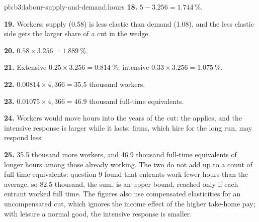 \begin{solution}{pb:b3:labour-supply-and-demand:hours}
\textbf{18.} $5 - 3.256 = 1.744~\%$.

\textbf{19.} Workers: supply (0.58) is less elastic than demand (1.08), and the less elastic
side gets the larger share of a cut in the wedge.

\textbf{20.} $0.58 \times 3.256 = 1.889~\%$.

\textbf{21.} Extensive $0.25 \times 3.256 = 0.814~\%$; intensive $0.33 \times 3.256 = 1.075~\%$.

\textbf{22.} $0.00814 \times 4{,}366 = 35.5$ thousand workers.

\textbf{23.} $0.01075 \times 4{,}366 = 46.9$ thousand full-time equivalents.

\textbf{24.} Workers would move hours into the years of the cut: the 
applies, and the intensive response is larger while it lasts; firms, which hire for
the long run, may respond less.

\textbf{25.} 35.5 thousand more workers, and 46.9 thousand full-time equivalents of longer
hours among those already working. The two do not add up to a count of full-time
equivalents: question 9 found that entrants work fewer hours than the average, so
82.5 thousand, the sum, is an upper bound, reached only if each entrant worked full time.
The figures also use compensated elasticities for an uncompensated cut, which ignores
the income effect of the higher take-home pay; with leisure a normal good, the
intensive response is smaller.
\end{solution}

